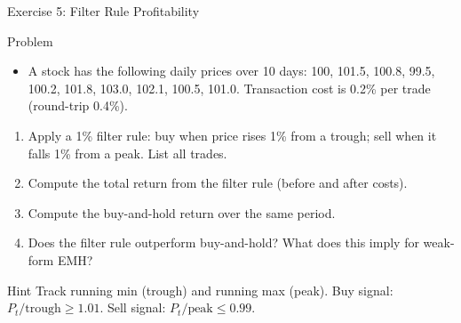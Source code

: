 \documentclass[9pt, aspectratio=169, t]{beamer}
\theoremstyle{definition}
\newenvironment{cminipage}[1]{%
    \par\noindent\hfill\begin{minipage}{#1}\ignorespaces
}{%
    \end{minipage}\hfill\null\par
}
\begin{document}
\begin{frame}{Exercise 5: Filter Rule Profitability}
\begin{cminipage}{0.95\textwidth}
\begin{block}{Problem}
\begin{itemize}
\item A stock has the following daily prices over 10 days: 100, 101.5, 100.8, 99.5, 100.2, 101.8, 103.0, 102.1, 100.5, 101.0. Transaction cost is 0.2\% per trade (round-trip 0.4\%).
\end{itemize}
\end{block}
\begin{enumerate}
    \item Apply a 1\% filter rule: buy when price rises 1\% from a trough; sell when it falls 1\% from a peak. List all trades.
    \item Compute the total return from the filter rule (before and after costs).
    \item Compute the buy-and-hold return over the same period.
    \item Does the filter rule outperform buy-and-hold? What does this imply for weak-form EMH?
\end{enumerate}
\vspace{0.1cm}
\begin{exampleblock}{Hint}
Track running min (trough) and running max (peak). Buy signal: $P_t / \text{trough} \geq 1.01$. Sell signal: $P_t / \text{peak} \leq 0.99$.
\end{exampleblock}
\end{cminipage}
\end{frame}
\end{document}
